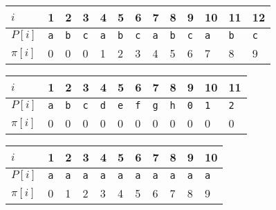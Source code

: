 \begin{table}[]
\begin{tabular}{l|l|l|l|l|l|l|l|l|l|l|l|l|}
\cline{2-13}
$i$        & 1         & 2         & 3         & 4          & 5         & 6         & 7         & 8         & 9         & 10        & 11        & 12        \\ \hline
$P[i]$   & \texttt{a} & \texttt{b} & \texttt{c} & \texttt{a} & \texttt{b} & \texttt{c} & \texttt{a} & \texttt{b} & \texttt{c} & \texttt{a} & \texttt{b} & \texttt{c} \\ \hline
$\pi[i]$ & 0         & 0         & 0         & 1          & 2         & 3         & 4         & 5         & 6         & 7         & 8         & 9         \\ \cline{2-13} 
\end{tabular}
\end{table}

\begin{table}[]
\begin{tabular}{l|l|l|l|l|l|l|l|l|l|l|l|}
\cline{2-12}
$i$        & 1         & 2         & 3         & 4         & 5         & 6         & 7         & 8         & 9         & 10        & 11        \\ \hline
$P[i]$   & \texttt{a} & \texttt{b} & \texttt{c} & \texttt{d} & \texttt{e} & \texttt{f} & \texttt{g} & \texttt{h} & \texttt{0} & \texttt{1} & \texttt{2} \\ \hline
$\pi[i]$ & 0         & 0         & 0         & 0         & 0         & 0         & 0         & 0         & 0         & 0         & 0         \\ \cline{2-12} 
\end{tabular}
\end{table}

\begin{table}[]
\begin{tabular}{l|l|l|l|l|l|l|l|l|l|l|}
\cline{2-11}
$i$        & 1         & 2         & 3         & 4         & 5         & 6         & 7         & 8         & 9         & 10        \\ \hline
$P[i]$   & \texttt{a} & \texttt{a} & \texttt{a} & \texttt{a} & \texttt{a} & \texttt{a} & \texttt{a} & \texttt{a} & \texttt{a} & \texttt{a} \\ \hline
$\pi[i]$ & 0         & 1         & 2         & 3         & 4         & 5         & 6         & 7         & 8         & 9         \\ \cline{2-11} 
\end{tabular}
\end{table}

